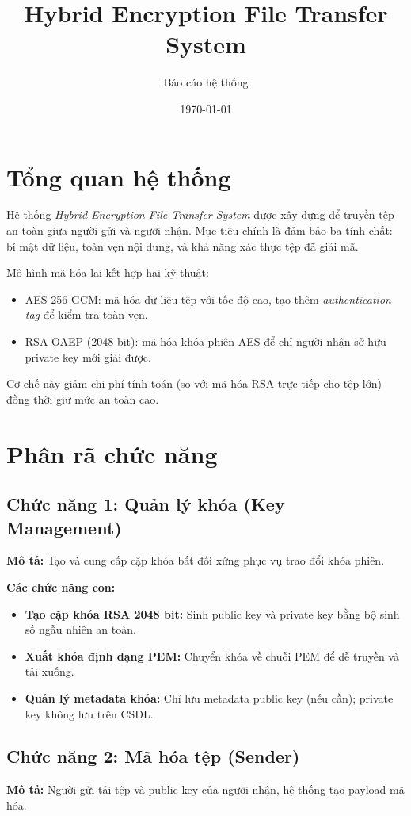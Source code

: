 \documentclass{article}
\title{Hybrid Encryption File Transfer System}
\author{Báo cáo hệ thống}
\date{\today}
\begin{document}
\maketitle

\section{Tổng quan hệ thống}
Hệ thống \textit{Hybrid Encryption File Transfer System} được xây dựng để truyền tệp an toàn giữa người gửi và người nhận. Mục tiêu chính là đảm bảo ba tính chất: bí mật dữ liệu, toàn vẹn nội dung, và khả năng xác thực tệp đã giải mã.

Mô hình mã hóa lai kết hợp hai kỹ thuật:
\begin{itemize}
	\item AES-256-GCM: mã hóa dữ liệu tệp với tốc độ cao, tạo thêm \textit{authentication tag} để kiểm tra toàn vẹn.
	\item RSA-OAEP (2048 bit): mã hóa khóa phiên AES để chỉ người nhận sở hữu private key mới giải được.
\end{itemize}
Cơ chế này giảm chi phí tính toán (so với mã hóa RSA trực tiếp cho tệp lớn) đồng thời giữ mức an toàn cao.

\section{Phân rã chức năng}
\subsection{Chức năng 1: Quản lý khóa (Key Management)}
\textbf{Mô tả:} Tạo và cung cấp cặp khóa bất đối xứng phục vụ trao đổi khóa phiên.

\textbf{Các chức năng con:}
\begin{itemize}
	\item \textbf{Tạo cặp khóa RSA 2048 bit:} Sinh public key và private key bằng bộ sinh số ngẫu nhiên an toàn.
	\item \textbf{Xuất khóa định dạng PEM:} Chuyển khóa về chuỗi PEM để dễ truyền và tải xuống.
	\item \textbf{Quản lý metadata khóa:} Chỉ lưu metadata public key (nếu cần); private key không lưu trên CSDL.
\end{itemize}

\subsection{Chức năng 2: Mã hóa tệp (Sender)}
\textbf{Mô tả:} Người gửi tải tệp và public key của người nhận, hệ thống tạo payload mã hóa.
\end{document}
